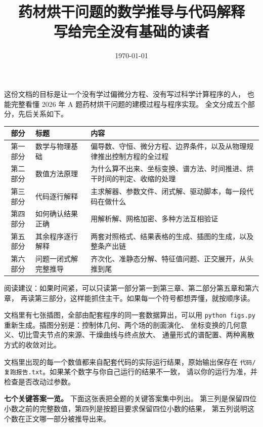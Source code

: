 \documentclass[12pt,a4paper]{article}
\title{\bfseries 药材烘干问题的数学推导与代码解释\\[4pt]
\large 写给完全没有基础的读者}
\author{}
\date{\today}
\begin{document}
\maketitle
\thispagestyle{empty}

\vspace{1em}
\noindent
这份文档的目标是让一个没有学过偏微分方程、没有写过科学计算程序的人，
也能完整看懂 2026 年 A 题药材烘干问题的建模过程与程序实现。
全文分成五个部分，先后关系如下。

\begin{center}
\begin{tabular}{@{}clp{8.6cm}@{}}
\toprule
部分 & 标题 & 内容 \\
\midrule
第一部分 & 数学与物理基础 & 偏导数、守恒、微分方程、边界条件，以及从物理规律推出控制方程的全过程 \\
第二部分 & 数值方法原理 & 为什么算不出来、坐标变换、谱方法、时间推进、烘干时间的判定、收缩的处理 \\
第三部分 & 代码逐行解释 & 主求解器、参数文件、闭式解、驱动脚本，每一段代码在做什么 \\
第四部分 & 如何确认结果正确 & 用解析解、网格加密、多种方法互相验证 \\
第五部分 & 其余程序逐行解释 & 两套对照格式、结果表格的生成、插图的生成，以及整条产出链 \\
第六部分 & 问题一闭式解完整推导 & 齐次化、准静态分解、特征值问题、正交展开，从头推到尾 \\
\bottomrule
\end{tabular}
\end{center}

\noindent
阅读建议：如果时间紧，可以只读第一部分第一到第三章、第二部分第五章和第六章，
再读第三部分，这样能抓住主干。如果每一个符号都想弄懂，就按顺序读。

\vspace{4pt}
\noindent
文档里有七张插图，全部由配套程序的同一套数据算出，可以用
\texttt{python figs.py} 重新生成。插图分别是：控制体几何、两个场的剖面演化、
坐标变换的几何意义、切比雪夫节点的来源、干燥曲线与终点放大、
通量形式的谱配置、两种离散方式的收敛对比。

\vspace{4pt}
\noindent
文档里出现的每一个数值都来自配套代码的实际运行结果，原始输出保存在
\texttt{代码/复跑报告.txt}。如果某个数字与你自己运行的结果不一致，
请以你的运行为准，并检查是否改动过参数。

\vspace{8pt}
\noindent\textbf{七个关键答案一览。}
下面这张表把全题的关键答案集中列出。
第三列是保留四位小数之前的完整数值，第四列是按题目要求保留四位小数的结果，
第五列说明这个数在正文哪一部分被推导出来。
\end{document}
